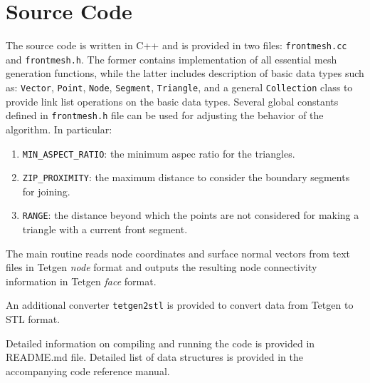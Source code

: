 \documentclass[12pt]{article}
\begin{document}
\section{Source Code}

The source code is written in C++ and is provided in two files: {\tt frontmesh.cc} and {\tt frontmesh.h}.
The former contains implementation of all essential mesh generation functions, while the latter includes description of basic data types such as:
{\tt Vector}, {\tt Point}, {\tt Node}, {\tt Segment}, {\tt Triangle}, and a general {\tt Collection} class to provide link list operations on the basic data types. 
Several global constants defined in {\tt frontmesh.h} file can be used for adjusting the behavior of the algorithm. In particular:

\begin{enumerate}
\item \verb!MIN_ASPECT_RATIO!: the minimum aspec ratio for the triangles.
\item \verb!ZIP_PROXIMITY!: the maximum distance to consider the boundary segments for joining.
\item \verb!RANGE!: the distance beyond which the points are not considered for making a triangle with a current front segment. 
\end{enumerate}

The main routine reads node coordinates and surface normal vectors from text files in Tetgen {\em node} format \cite{TetgenFF} and outputs the resulting node connectivity information in Tetgen {\em face} format.

An additional converter {\tt tetgen2stl} is provided to convert data from Tetgen to STL format.

Detailed information on compiling and running the code is provided in README.md file. Detailed list of data structures is provided in the accompanying code reference manual.



%


\end{document}
